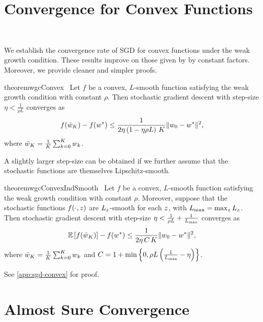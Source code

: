 \section{Convergence for Convex Functions}~\label{sec:sgd-convex}

We establish the convergence rate of SGD for convex functions under the weak growth condition. These results improve on those given by \citet{vaswani2019fast} by constant factors. 
Moreover, we provide cleaner and simpler proofs.


\begin{restatable}{theorem}{wgcConvex}~\label{thm:wgc-convex}
    Let \( f \) be a convex, \( L \)-smooth function satisfying the weak growth condition with constant \( \rho  \).
    Then stochastic gradient descent with step-size \( \eta < \frac{1}{\rho L} \) converges as
    \[ f(\bar {w}_K) - f(w^*) \leq \frac{1}{2 \eta \left(1 - \eta \rho L\right) \, K} \|w_0 - w^*\|^2, \]
    where \( \bar {w}_K = \frac{1}{K} \sum_{k=0}^K w_k \). 
\end{restatable}

A slightly larger step-size can be obtained if we further assume that the stochastic functions are themselves Lipschitz-smooth.

\begin{restatable}{theorem}{wgcConvexIndSmooth}~\label{thm:wgc-convex-ind-smooth}
    Let \( f \) be a convex, \( L \)-smooth function satisfying the weak growth condition with constant \( \rho  \).
    Moreover, suppose that the stochastic functions \( f(\cdot, z) \) are \( L_z \)-smooth for each \( z \), with \( L_{\text{max}} = \max_z L_z \).
    Then stochastic gradient descent with step-size \( \eta < \frac{1}{\rho L} + \frac{1}{L_{\text{max}}} \) converges as
    \[ \mathbb{E}\left[f(\bar w_K)\right] - f(w^*) \leq \frac{1}{2\eta \, C \, K} \|w_0 - w^*\|^2,   \]
    where \( \bar {w}_K = \frac{1}{K} \sum_{k=0}^K w_k \) and \( C = 1 + \min \left\{ 0, \rho L \left(\frac{1}{L_{\text{max}}} - \eta \right)\right\} \). 
\end{restatable}

See \autoref{app:sgd-convex} for proof.

\section{Almost Sure Convergence}

